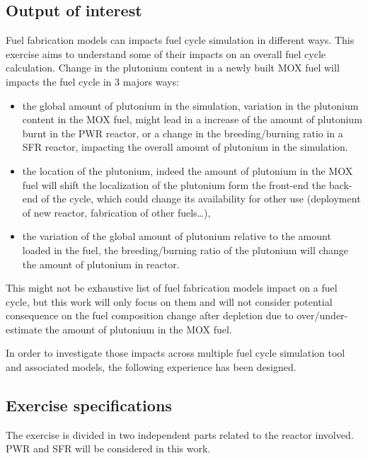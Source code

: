 \subsection{Output of interest}

Fuel fabrication models can impacts fuel cycle simulation in different ways.
This exercise aims to understand some of their impacts on an overall fuel cycle
calculation. Change in the plutonium content in a newly built MOX fuel will
impacts the fuel cycle in 3 majors ways:

\begin{itemize}
    \item the global amount of plutonium in the simulation, variation in the
        plutonium content in the MOX fuel, might lead in a increase of the
        amount of plutonium burnt in the PWR reactor, or a change in the
        breeding/burning ratio in a SFR reactor, impacting the overall amount of
        plutonium in the simulation.
    \item the location of the plutonium, indeed the amount of plutonium in the
        MOX fuel will shift the localization of the plutonium form the front-end
        the back-end of the cycle, which could change its availability for
        other use (deployment of new reactor, fabrication of other fuels\ldots),
    \item the variation of the global amount of plutonium relative to the amount
        loaded in the fuel, the breeding/burning ratio of the plutonium will
        change the amount of plutonium in reactor.
\end{itemize}

This might not be exhaustive list of fuel fabrication models impact on a fuel
cycle, but this work will only focus on them and will not consider potential
consequence on the fuel composition change after depletion due to
over/under-estimate the amount of plutonium in the MOX fuel.

In order to investigate those impacts across multiple fuel cycle simulation tool
and associated models, the following experience has been designed.

\subsection{Exercise specifications}

The exercise is divided in two independent parts related to the reactor involved. \gls{PWR} and \gls{SFR} will be considered in this work.

